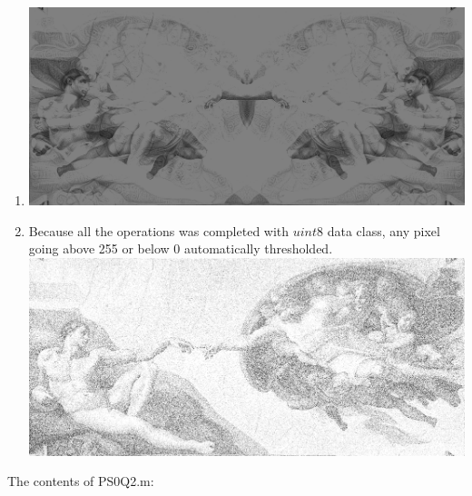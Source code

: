 \documentclass[man]{apa6}
\begin{document}
\begin{enumerate}
\begin{enumerate}
				\item \includegraphics[width=\textwidth]{plots/2/avgImgPS0Q2.png}
				\item Because all the operations was completed with $uint8$ data class, any pixel going above 255 or below 0 automatically thresholded. \\
					\includegraphics[width=\textwidth]{plots/2/addNoiseImgPS0Q2.png}
			\end{enumerate}
		The contents of PS0Q2.m: \\
		
	\end{enumerate}
\end{document}
